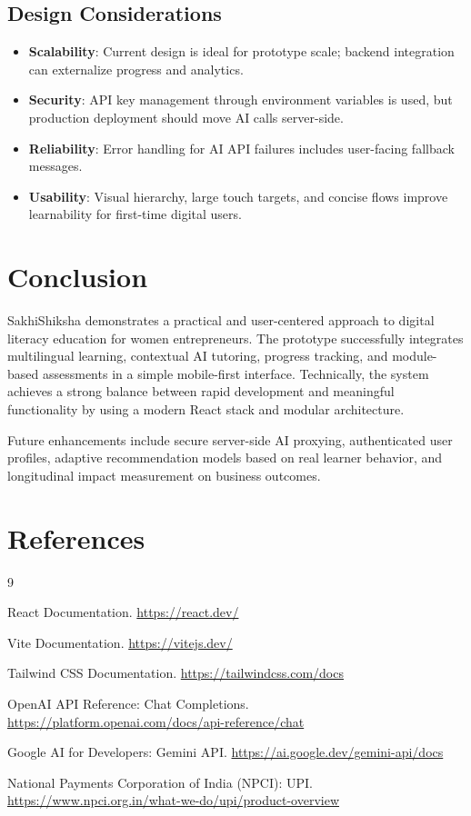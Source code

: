 \documentclass[12pt,a4paper]{article}
\begin{document}
\subsection{Design Considerations}
\begin{itemize}[leftmargin=*]
\item \textbf{Scalability}: Current design is ideal for prototype scale; backend integration can externalize progress and analytics.
\item \textbf{Security}: API key management through environment variables is used, but production deployment should move AI calls server-side.
\item \textbf{Reliability}: Error handling for AI API failures includes user-facing fallback messages.
\item \textbf{Usability}: Visual hierarchy, large touch targets, and concise flows improve learnability for first-time digital users.
\end{itemize}

\section{Conclusion}
SakhiShiksha demonstrates a practical and user-centered approach to digital literacy education for women entrepreneurs. The prototype successfully integrates multilingual learning, contextual AI tutoring, progress tracking, and module-based assessments in a simple mobile-first interface. Technically, the system achieves a strong balance between rapid development and meaningful functionality by using a modern React stack and modular architecture.

Future enhancements include secure server-side AI proxying, authenticated user profiles, adaptive recommendation models based on real learner behavior, and longitudinal impact measurement on business outcomes.

\section{References}
\begin{thebibliography}{9}

React Documentation.
\newblock \url{https://react.dev/}

Vite Documentation.
\newblock \url{https://vitejs.dev/}

Tailwind CSS Documentation.
\newblock \url{https://tailwindcss.com/docs}

OpenAI API Reference: Chat Completions.
\newblock \url{https://platform.openai.com/docs/api-reference/chat}

Google AI for Developers: Gemini API.
\newblock \url{https://ai.google.dev/gemini-api/docs}

National Payments Corporation of India (NPCI): UPI.
\newblock \url{https://www.npci.org.in/what-we-do/upi/product-overview}

\end{thebibliography}
\end{document}
